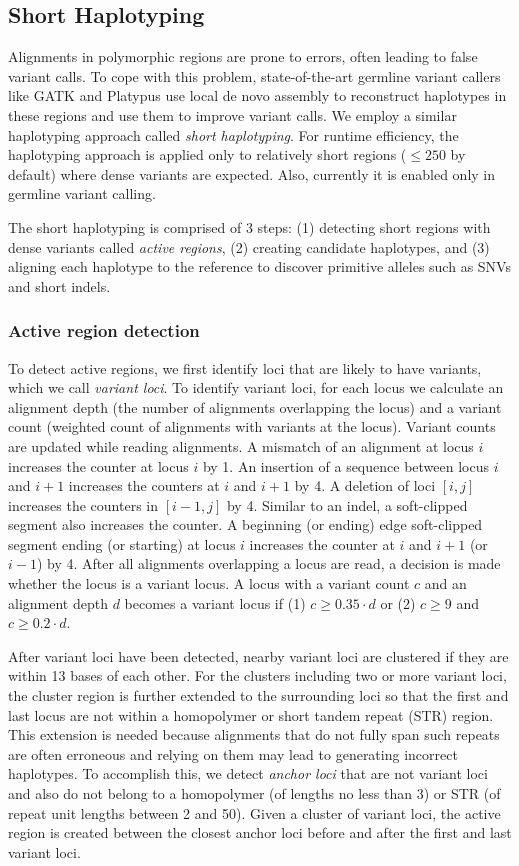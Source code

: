 \documentclass{article}
\begin{document}
\subsection{Short Haplotyping}

Alignments in polymorphic regions are prone to errors, often leading to false variant calls. To cope with this problem, state-of-the-art germline variant callers like GATK and Platypus use local de novo assembly to reconstruct haplotypes in these regions and use them to improve variant calls. We employ a similar haplotyping approach called {\em short haplotyping}. For runtime efficiency, the haplotyping approach is applied only to relatively short regions ($\leq 250$ by default) where dense variants are expected. Also, currently it is enabled only in germline variant calling.

The short haplotyping is comprised of 3 steps: (1) detecting short regions with dense variants called {\em active regions}, (2) creating candidate haplotypes, and (3) aligning each haplotype to the reference to discover primitive alleles such as SNVs and short indels.

\subsubsection{Active region detection}
To detect active regions, we first identify loci that are likely to have variants, which we call {\em variant loci}. To identify variant loci, for each locus we calculate an alignment depth (the number of alignments overlapping the locus) and a variant count (weighted count of alignments with variants at the locus). Variant counts are updated while reading alignments. A mismatch of an alignment at locus $i$ increases the counter at locus $i$ by 1. An insertion of a sequence between locus $i$ and $i+1$ increases the counters at $i$ and $i+1$ by 4. A deletion of loci $[i,j]$ increases the counters in $[i-1,j]$ by 4. Similar to an indel, a soft-clipped segment also increases the counter. A beginning (or ending) edge soft-clipped segment ending (or starting) at locus $i$ increases the counter at $i$ and $i+1$ (or $i-1$) by 4. After all alignments overlapping a locus are read, a decision is made whether the locus is a variant locus. A locus with a variant count $c$ and an alignment depth $d$ becomes a variant locus if (1) $c \geq 0.35 \cdot d$ or (2) $c \geq 9$ and $c \geq 0.2 \cdot d$.

After variant loci have been detected, nearby variant loci are clustered if they are within 13 bases of each other. For the clusters including two or more variant loci, the cluster region is further extended to the surrounding loci so that the first and last locus are not within a homopolymer or short tandem repeat (STR) region. This extension is needed because alignments that do not fully span such repeats are often erroneous and relying on them may lead to generating incorrect haplotypes. To accomplish this, we detect {\em anchor loci} that are not variant loci and also do not belong to a homopolymer (of lengths no less than 3) or STR (of repeat unit lengths between 2 and 50). Given a cluster of variant loci, the active region is created between the closest anchor loci before and after the first and last variant loci.
\end{document}
